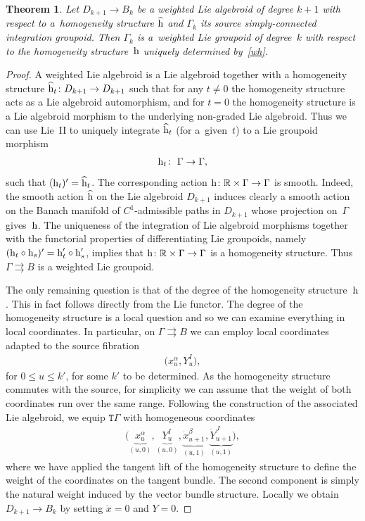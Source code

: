 \documentclass[pdftex]{sigma}
\newcommand{\rmh}{\textnormal{h}}
\def\sT{{\mathtt T}}
\numberwithin{equation}{section}
\newtheorem{Theorem}{Theorem}[section]
\begin{document}
 \begin{Theorem}
Let $D_{k+1} \rightarrow B_{k}$ be a weighted Lie algebroid of degree $k+1$ with respect to a~homogeneity structure $\widehat{\rm h}$ and $\Gamma_{k}$ its source simply-connected integration groupoid.
Then $\Gamma_{k}$ is a~weighted Lie groupoid of degree~$k$ with respect to the homogeneity structure~${\rm h}$ uniquely determined by~\eqref{wh}.
\end{Theorem}

\begin{proof}
A weighted Lie algebroid  is a Lie algebroid together with a homogeneity structure   $\widehat{\rmh}_{t}\colon D_{k+1} \rightarrow D_{k+1}$ such that  for  any $t\neq 0$ the homogeneity structure acts as  a  Lie algebroid automorphism, and for $t=0$  the homogeneity structure is a Lie algebroid morphism to the underlying non-graded Lie algebroid. Thus we can use Lie~II to uniquely integrate $\widehat{\rmh}_{t}$ (for a~given~$t$) to a Lie groupoid morphism
\begin{gather*}
\rmh_{t}\colon \  \Gamma \rightarrow \Gamma,
\end{gather*}
 such that ($\rmh_{t})' = \widehat{\rmh}_{t}$.
 The corresponding action $\rmh\colon {\mathbb R}\times\Gamma\to\Gamma$ is smooth. Indeed, the smooth action $\widehat{\rmh}$ on the Lie algebroid $D_{k+1}$ induces clearly a smooth action on the Banach manifold of $C^1$-admissible paths in $D_{k+1}$ whose projection on~$\Gamma$ gives~$\rmh$.
The uniqueness of the integration of Lie algebroid morphisms   together with the functorial properties of dif\/ferentiating Lie groupoids,  namely $(\rmh_{t} \circ \rmh_{s})'= \rmh'_{t} \circ \rmh'_{s}$, implies that  $\rmh\colon \mathbb{R} \times  \Gamma \rightarrow \Gamma$ is a homogeneity structure. Thus $\Gamma \rightrightarrows B$ is a weighted Lie groupoid.

 The only remaining question is that of the degree of the homogeneity structure~$\rmh$. This in fact follows directly from the Lie functor. The degree of the homogeneity structure is a local question and so we can examine everything in local coordinates.  In particular, on $\Gamma \rightrightarrows B$ we can employ local  coordinates adapted to the source f\/ibration
\begin{gather*}
\big(x^{\alpha}_{u},  Y_{u}^{I}\big),
\end{gather*}
\noindent for $0 \leq u \leq k'$, for some $k'$ to be determined. As the homogeneity structure commutes with the source, for simplicity we can assume that the weight of both coordinates run over the same range.  Following the construction of the associated Lie algebroid, we equip $\sT \Gamma$ with homogeneous coordinates
\begin{gather*}
\big(\underbrace{x^{\alpha}_{u}}_{(u,0)},  \underbrace{Y_{u}^{I}}_{(u,0)},  \underbrace{\dot{x}^{\beta}_{u+1}}_{(u,1)},  \underbrace{\dot{Y}_{u+1}^{J}}_{(u,1)} \big),
 \end{gather*}
where we have applied the tangent lift of the homogeneity structure to def\/ine the weight of the coordinates on the tangent bundle. The second component is simply the natural weight induced by the vector bundle structure. Locally we obtain $D_{k+1} \rightarrow B_{k}$ by setting $\dot{x} =0$ and $Y =0$.


\end{proof}
\end{document}
